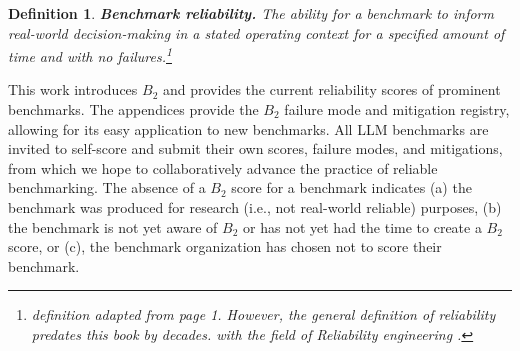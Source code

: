 \documentclass{article}
\newtheorem{dfn}{Definition}[section]
\newcommand\bb{$B_2$ }
\begin{document}
\begin{dfn}
\label{dfn:benchmark_reliability}
{\bf Benchmark reliability.} The ability for a benchmark to inform real-world decision-making in a stated operating context for a specified amount of time and with no failures.\footnote{ definition adapted from \cite{Rausand2004} page 1. However, the general definition of reliability predates this book by decades. \cite{ReliabilityMcLinn} with the field of Reliability engineering .}
\end{dfn}



This work introduces \bb and provides the current reliability scores of prominent benchmarks. The appendices provide the \bb failure mode and mitigation registry, allowing for its easy application to new benchmarks. All LLM benchmarks are invited to self-score and submit their own scores, failure modes, and mitigations, from which we hope to collaboratively advance the practice of reliable benchmarking. The absence of a \bb score for a benchmark indicates (a) the benchmark was produced for research (i.e., not real-world reliable) purposes, (b) the benchmark is not yet aware of \bb or has not yet had the time to create a \bb score, or (c), the benchmark organization has chosen not to score their benchmark.
\end{document}
